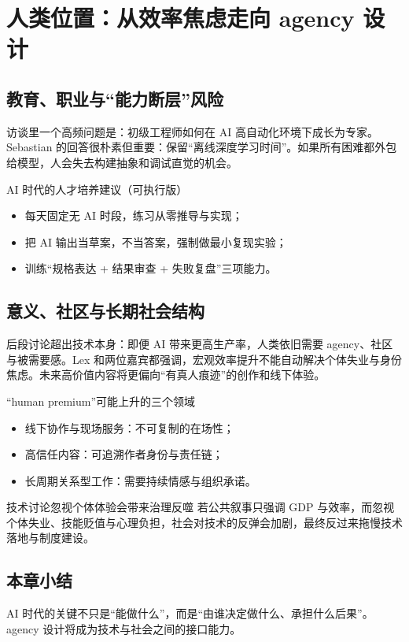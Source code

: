\section{人类位置：从效率焦虑走向 agency 设计}

\subsection{教育、职业与“能力断层”风险}

访谈里一个高频问题是：初级工程师如何在 AI 高自动化环境下成长为专家。Sebastian 的回答很朴素但重要：保留“离线深度学习时间”。如果所有困难都外包给模型，人会失去构建抽象和调试直觉的机会。

\begin{importantbox}{AI 时代的人才培养建议（可执行版）}
\begin{itemize}[leftmargin=1.5em]
    \item 每天固定无 AI 时段，练习从零推导与实现；
    \item 把 AI 输出当草案，不当答案，强制做最小复现实验；
    \item 训练“规格表达 + 结果审查 + 失败复盘”三项能力。
\end{itemize}
\end{importantbox}

\subsection{意义、社区与长期社会结构}

后段讨论超出技术本身：即便 AI 带来更高生产率，人类依旧需要 agency、社区与被需要感。Lex 和两位嘉宾都强调，宏观效率提升不能自动解决个体失业与身份焦虑。未来高价值内容将更偏向“有真人痕迹”的创作和线下体验。

\begin{knowledgebox}{“human premium”可能上升的三个领域}
\begin{itemize}[leftmargin=1.5em]
    \item 线下协作与现场服务：不可复制的在场性；
    \item 高信任内容：可追溯作者身份与责任链；
    \item 长周期关系型工作：需要持续情感与组织承诺。
\end{itemize}
\end{knowledgebox}

\begin{warningbox}{技术讨论忽视个体体验会带来治理反噬}
若公共叙事只强调 GDP 与效率，而忽视个体失业、技能贬值与心理负担，社会对技术的反弹会加剧，最终反过来拖慢技术落地与制度建设。
\end{warningbox}

\subsection{本章小结}

AI 时代的关键不只是“能做什么”，而是“由谁决定做什么、承担什么后果”。agency 设计将成为技术与社会之间的接口能力。

